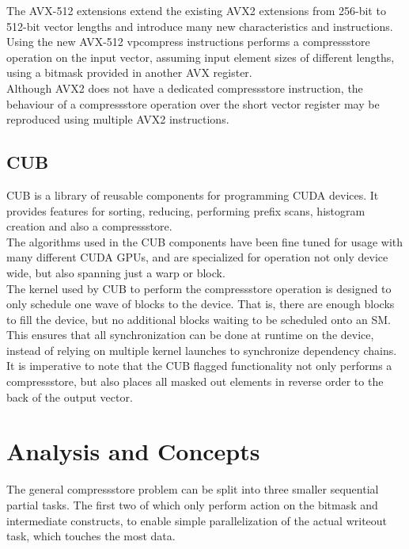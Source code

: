 \documentclass{tudscrreprt}
\begin{document}
			The AVX-512 extensions extend the existing AVX2 extensions from 256-bit to 512-bit vector lengths and introduce many new characteristics and instructions. Using the new AVX-512 vpcompress instructions performs a compressstore operation on the input vector, assuming input element sizes of different lengths, using a bitmask provided in another AVX register. \\
			
			Although AVX2 does not have a dedicated compressstore instruction, the behaviour of a compressstore operation over the short vector register may be reproduced using multiple AVX2 instructions. \\
		
		\section{CUB}
			CUB \cite{cub} is a library of reusable components for programming CUDA devices. It provides features for sorting, reducing, performing prefix scans, histogram creation and also a compressstore. \\
			The algorithms used in the CUB components have been fine tuned for usage with many different CUDA GPUs, and are specialized for operation not only device wide, but also spanning just a warp or block. \\
			
			The kernel used by CUB to perform the compressstore operation is designed to only schedule one wave of blocks to the device. That is, there are enough blocks to fill the device, but no additional blocks waiting to be scheduled onto an SM. This ensures that all synchronization can be done at runtime on the device, instead of relying on multiple kernel launches to synchronize dependency chains. \\
			
			It is imperative to note that the CUB flagged functionality not only performs a compressstore, but also places all masked out elements in reverse order to the back of the output vector. \\
		
	\chapter{Analysis and Concepts}
		The general compressstore problem can be split into three smaller sequential partial tasks. The first two of which only perform action on the bitmask and intermediate constructs, to enable simple parallelization of the actual writeout task, which touches the most data. \\
		
\end{document}
